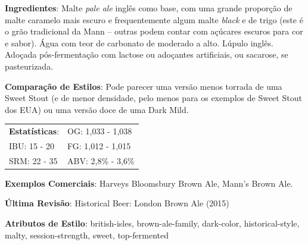 \textbf{Ingredientes}: Malte \textit{pale ale} inglês como base, com uma grande proporção de malte caramelo mais escuro e frequentemente algum malte \textit{black} e de trigo (este é o grão tradicional da Mann – outras podem contar com açúcares escuros para cor e sabor). Água com teor de carbonato de moderado a alto. Lúpulo inglês. Adoçada pós-fermentação com lactose ou adoçantes artificiais, ou sacarose, se pasteurizada.

\textbf{Comparação de Estilos}: Pode parecer uma versão menos torrada de uma Sweet Stout (e de menor densidade, pelo menos para os exemplos de Sweet Stout dos EUA) ou uma versão doce de uma Dark Mild.

\begin{tabular}{@{}p{35mm}p{35mm}@{}}
  \textbf{Estatísticas}: & OG: 1,033 - 1,038  \\
  IBU: 15 - 20  & FG: 1,012 - 1,015  \\
  SRM: 22 - 35 & ABV: 2,8\% - 3,6\%
\end{tabular}

\textbf{Exemplos Comerciais}: Harveys Bloomsbury Brown Ale, Mann's Brown Ale.

\textbf{Última Revisão}: Historical Beer: London Brown Ale (2015)

\textbf{Atributos de Estilo}: british-isles, brown-ale-family, dark-color, historical-style, malty, session-strength, sweet, top-fermented
